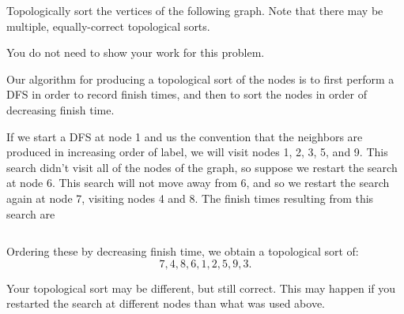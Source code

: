 \begin{prob}
    Topologically sort the vertices of the following graph. Note that there
    may be multiple, equally-correct topological sorts.

    You do not need to show your work for this problem.

    \vspace{1em}

    \begin{center}
    \end{center}

    \begin{soln}
        Our algorithm for producing a topological sort of the nodes is to 
        first perform a DFS in order to record finish times, and then to
        sort the nodes in order of decreasing finish time.

        If we start a DFS at node 1 and us the convention that the neighbors
        are produced in increasing order of label, we will visit nodes 1, 2, 3,
        5, and 9. This search didn't visit all of the nodes of the graph, so
        suppose we restart the search at node 6. This search will not move away
        from 6, and so we restart the search again at node 7, visiting nodes 4 and 8.
        The finish times resulting from this search are
        \inputminted{python}{\thisdir/include-solution/topo_answer.py}

        Ordering these by decreasing finish time, we obtain a topological sort of:
        \[
            7, 4, 8, 6, 1, 2, 5, 9, 3.
        \]

        Your topological sort may be different, but still correct. This may happen
        if you restarted the search at different nodes than what was used above.
    \end{soln}

\end{prob}
